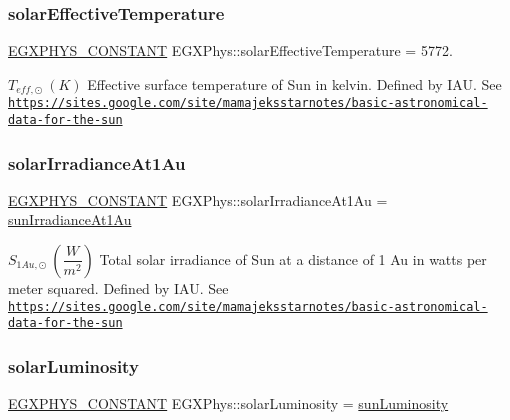 \subsubsection{\texorpdfstring{solar\+Effective\+Temperature}{solarEffectiveTemperature}}
{\footnotesize\ttfamily \mbox{\hyperlink{group___e_g_x_phys-_constants-_macros_ga76980d288494ce1714c9ac68a95ba702}{E\+G\+X\+P\+H\+Y\+S\+\_\+\+C\+O\+N\+S\+T\+A\+NT}} E\+G\+X\+Phys\+::solar\+Effective\+Temperature = 5772.}

$ T_{eff,\odot} \ (K)$ Effective surface temperature of Sun in kelvin. Defined by I\+AU. See \href{https://sites.google.com/site/mamajeksstarnotes/basic-astronomical-data-for-the-sun}{\tt https\+://sites.\+google.\+com/site/mamajeksstarnotes/basic-\/astronomical-\/data-\/for-\/the-\/sun} \mbox{\label{group___e_g_x_phys-_constants-_astrophysics-_solar_system-_sun-_bulk_ga4ed5c970359ffccba0d45fc95541b332}} 
\subsubsection{\texorpdfstring{solar\+Irradiance\+At1\+Au}{solarIrradianceAt1Au}}
{\footnotesize\ttfamily \mbox{\hyperlink{group___e_g_x_phys-_constants-_macros_ga76980d288494ce1714c9ac68a95ba702}{E\+G\+X\+P\+H\+Y\+S\+\_\+\+C\+O\+N\+S\+T\+A\+NT}} E\+G\+X\+Phys\+::solar\+Irradiance\+At1\+Au = \mbox{\hyperlink{group___e_g_x_phys-_constants-_astrophysics-_solar_system-_sun-_bulk_ga7632e3eda212f81ae257daab783a1a3f}{sun\+Irradiance\+At1\+Au}}}

$ S_{1Au,\odot} \ (\dfrac{W}{m^2})$ Total solar irradiance of Sun at a distance of 1 Au in watts per meter squared. Defined by I\+AU. See \href{https://sites.google.com/site/mamajeksstarnotes/basic-astronomical-data-for-the-sun}{\tt https\+://sites.\+google.\+com/site/mamajeksstarnotes/basic-\/astronomical-\/data-\/for-\/the-\/sun} \mbox{\label{group___e_g_x_phys-_constants-_astrophysics-_solar_system-_sun-_bulk_ga1fa4f167b9b8f594d35d879fdfdde7b4}} 
\subsubsection{\texorpdfstring{solar\+Luminosity}{solarLuminosity}}
{\footnotesize\ttfamily \mbox{\hyperlink{group___e_g_x_phys-_constants-_macros_ga76980d288494ce1714c9ac68a95ba702}{E\+G\+X\+P\+H\+Y\+S\+\_\+\+C\+O\+N\+S\+T\+A\+NT}} E\+G\+X\+Phys\+::solar\+Luminosity = \mbox{\hyperlink{group___e_g_x_phys-_constants-_astrophysics-_solar_system-_sun-_bulk_gaac188526cc9b051a26372e1a3b5b66b7}{sun\+Luminosity}}}


